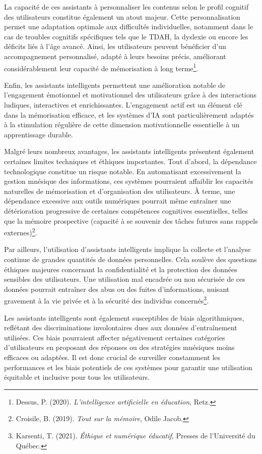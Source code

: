 \documentclass[12pt,a4paper]{report}
\begin{document}
La capacité de ces assistants à personnaliser les contenus selon le profil cognitif des utilisateurs constitue également un atout majeur. Cette personnalisation permet une adaptation optimale aux difficultés individuelles, notamment dans le cas de troubles cognitifs spécifiques tels que le TDAH, la dyslexie ou encore les déficits liés à l’âge avancé. Ainsi, les utilisateurs peuvent bénéficier d’un accompagnement personnalisé, adapté à leurs besoins précis, améliorant considérablement leur capacité de mémorisation à long terme\footnote{Dessus, P. (2020). \textit{L’intelligence artificielle en éducation}, Retz.}.

Enfin, les assistants intelligents permettent une amélioration notable de l’engagement émotionnel et motivationnel des utilisateurs grâce à des interactions ludiques, interactives et enrichissantes. L’engagement actif est un élément clé dans la mémorisation efficace, et les systèmes d’IA sont particulièrement adaptés à la stimulation régulière de cette dimension motivationnelle essentielle à un apprentissage durable.

Malgré leurs nombreux avantages, les assistants intelligents présentent également certaines limites techniques et éthiques importantes. Tout d’abord, la dépendance technologique constitue un risque notable. En automatisant excessivement la gestion mnésique des informations, ces systèmes pourraient affaiblir les capacités naturelles de mémorisation et d’organisation des utilisateurs. À terme, une dépendance excessive aux outils numériques pourrait même entraîner une détérioration progressive de certaines compétences cognitives essentielles, telles que la mémoire prospective (capacité à se souvenir des tâches futures sans rappels externes)\footnote{Croisile, B. (2019). \textit{Tout sur la mémoire}, Odile Jacob.}.

Par ailleurs, l’utilisation d'assistants intelligents implique la collecte et l’analyse continue de grandes quantités de données personnelles. Cela soulève des questions éthiques majeures concernant la confidentialité et la protection des données sensibles des utilisateurs. Une utilisation mal encadrée ou non sécurisée de ces données pourrait entraîner des abus ou des fuites d'informations, nuisant gravement à la vie privée et à la sécurité des individus concernés\footnote{Karsenti, T. (2021). \textit{Éthique et numérique éducatif}, Presses de l’Université du Québec.}.

Les assistants intelligents sont également susceptibles de biais algorithmiques, reflétant des discriminations involontaires dues aux données d’entraînement utilisées. Ces biais pourraient affecter négativement certaines catégories d’utilisateurs en proposant des réponses ou des stratégies mnésiques moins efficaces ou adaptées. Il est donc crucial de surveiller constamment les performances et les biais potentiels de ces systèmes pour garantir une utilisation équitable et inclusive pour tous les utilisateurs.
\end{document}
